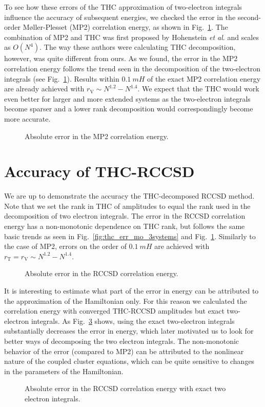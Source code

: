 To see how these errors of the THC approximation of two-electron 
integrals influence the accuracy of subsequent energies, we checked 
the error in the second-order M{\o}ller-Plesset (MP2) correlation
energy, as shown in Fig.~\ref{fig:mp2_err_ao_full}.  The combination
of MP2 and THC was first proposed by Hohenstein \emph{et
al}.\cite{hohenstein_thc2} and scales as $O(N^4)$.  The way these authors were 
calculating THC decomposition, however, was quite different from ours.
As we found, the error in the MP2 correlation energy follows the trend seen in 
the decomposition of the two-electron integrals (see 
Fig.~\ref{fig:mp2_err_ao_full}). Results within $0.1~mH$
of the exact MP2 correlation energy are already achieved with
$r_\mathrm{V} \sim N^{1.2} - N^{1.4}$.
We expect that the THC would work even better for larger and more extended 
systems as the two-electron integrals become sparser and a lower rank 
decomposition would correspondingly become more accurate.
%
\begin{figure}[tb]
\caption{Absolute error in the MP2 correlation energy.
\label{fig:mp2_err_ao_full}}
\end{figure}
%
\section{Accuracy of THC-RCCSD}
We are up to demonstrate the accuracy the THC-decomposed RCCSD
method. Note that we set the rank in THC of amplitudes to equal the rank 
used in the decomposition of two electron integrals. The error in the RCCSD 
correlation energy has a non-monotonic dependence on THC rank, but follows the 
same basic trends as seen in Fig.~\ref{fig:thc_err_mo_3systems} and
Fig.~\ref{fig:mp2_err_ao_full}. Similarly to the case of MP2, errors on 
the order of $0.1~mH$ are achieved with $r_\mathrm{T} = r_\mathrm{V} \sim 
N^{1.2} - N^{1.4}$.
%
\begin{figure}[tb]
\caption{Absolute error in the RCCSD correlation energy.
\label{fig:cc_err_ao_full}}
\end{figure}
%
It is interesting to estimate what part of the error in energy can be
attributed to the approximation of the Hamiltonian only. For this reason we 
calculated the correlation energy with converged THC-RCCSD amplitudes but exact
two-electron integrals.  As Fig.~\ref{fig:cc_err_ao_full_amps_only}
shows, using the exact two-electron integrals substantially decreases the error 
in energy, which later motivated us to look for better ways of decomposing the 
two electron integrals. The non-monotonic behavior of the error (compared to 
MP2) can be attributed to the nonlinear nature of the coupled cluster 
equations, which can be quite sensitive to changes in the parameters of the 
Hamiltonian.
%
\begin{figure}[tb]
\caption{Absolute error in the RCCSD correlation energy with exact two
electron integrals.
\label{fig:cc_err_ao_full_amps_only}}
\end{figure}
%
